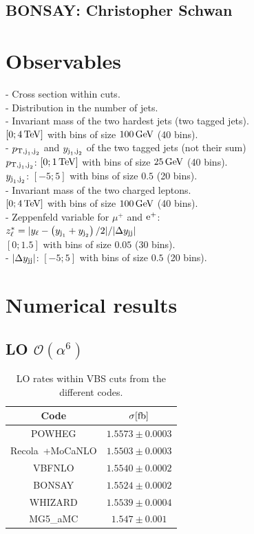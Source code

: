 \documentclass[a4paper,10pt]{report}
\begin{document}
\subsection{{\sc BONSAY}: Christopher Schwan}

\section{Observables}
- Cross section within cuts. \\
- Distribution in the number of jets. \\
- Invariant mass of the two hardest jets (two tagged jets). \\
$[0; 4\,\text{TeV}]$ with bins of size $100\,\text{GeV}$ (40 bins). \\
- $p_{\text{T},\text{j}_1,\text{j}_2}$ and $y_{\text{j}_1,\text{j}_2}$ of the two tagged jets (not their sum) \\
$p_{\text{T},\text{j}_1,\text{j}_2}$: $[0; 1\,\text{TeV}]$ with bins of size $25\,\text{GeV}$ (40 bins). \\
$y_{\text{j}_1,\text{j}_2}$: $[-5;5]$ with bins of size $0.5$ (20 bins). \\
- Invariant mass of the two charged leptons. \\
$[0; 4\,\text{TeV}]$ with bins of size $100\,\text{GeV}$ (40 bins). \\
- Zeppenfeld variable for $\mu^+$ and $\text{e}^+$: \\
$z^*_\ell = |y_\ell - \left(y_{\text{j}_1}+y_{\text{j}_2} \right)/2|/|\Delta y_{\text{j}\text{j}}|$ \\
$[0;1.5]$ with bins of size $0.05$ (30 bins). \\
- $|\Delta y_{\text{j} \text{j}}|$: $[-5;5]$ with bins of size $0.5$ (20 bins).


\section{Numerical results}

\subsection{LO $\mathcal{O}\left(\alpha^6\right)$}

\begin{table}[h!]
    \begin{tabular}{c|c}
        Code  &  $\sigma[\rm{fb}]$  \\
        \hline
        \hline
        {\sc POWHEG}  &  $1.5573 \pm 0.0003$ \\
        {\sc Recola\ +{\sc MoCaNLO}}  &  $1.5503 \pm 0.0003$ \\
        {\sc VBFNLO}  &  $1.5540 \pm 0.0002$ \\
        {\sc BONSAY}  &  $1.5524 \pm 0.0002$ \\
        {\sc WHIZARD} &  $1.5539 \pm 0.0004$ \\
        {\sc MG5\_aMC}&  $1.547 \pm 0.001$   
    \end{tabular}
    \caption{\label{tab:LOrates} LO rates within VBS cuts from the different codes.}
\end{table}
\end{document}
